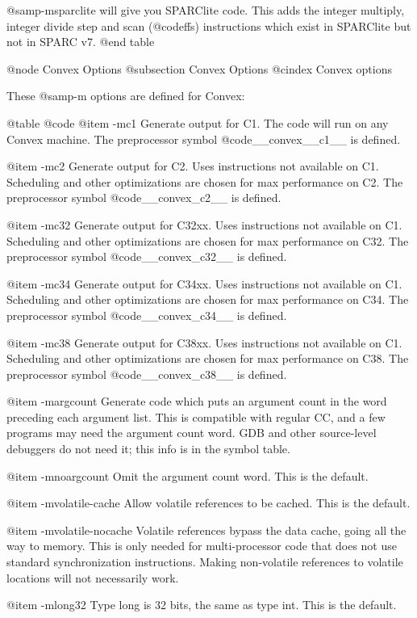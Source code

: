 {{@samp{-msparclite} will give you SPARClite code.  This adds the integer
multiply, integer divide step and scan (@code{ffs}) instructions which
exist in SPARClite but not in SPARC v7.
@end table

@node Convex Options
@subsection Convex Options
@cindex Convex options

These @samp{-m} options are defined for Convex:

@table @code
@item -mc1
Generate output for C1.  The code will run on any Convex machine.
The preprocessor symbol @code{__convex__c1__} is defined.

@item -mc2
Generate output for C2.  Uses instructions not available on C1.
Scheduling and other optimizations are chosen for max performance on C2.
The preprocessor symbol @code{__convex_c2__} is defined.

@item -mc32
Generate output for C32xx.  Uses instructions not available on C1.
Scheduling and other optimizations are chosen for max performance on C32.
The preprocessor symbol @code{__convex_c32__} is defined.

@item -mc34
Generate output for C34xx.  Uses instructions not available on C1.
Scheduling and other optimizations are chosen for max performance on C34.
The preprocessor symbol @code{__convex_c34__} is defined.

@item -mc38
Generate output for C38xx.  Uses instructions not available on C1.
Scheduling and other optimizations are chosen for max performance on C38.
The preprocessor symbol @code{__convex_c38__} is defined.

@item -margcount
Generate code which puts an argument count in the word preceding each
argument list.  This is compatible with regular CC, and a few programs
may need the argument count word.  GDB and other source-level debuggers
do not need it; this info is in the symbol table.

@item -mnoargcount
Omit the argument count word.  This is the default.

@item -mvolatile-cache
Allow volatile references to be cached.  This is the default.

@item -mvolatile-nocache
Volatile references bypass the data cache, going all the way to memory.
This is only needed for multi-processor code that does not use standard
synchronization instructions.  Making non-volatile references to volatile
locations will not necessarily work.

@item -mlong32
Type long is 32 bits, the same as type int.  This is the default.

}}
